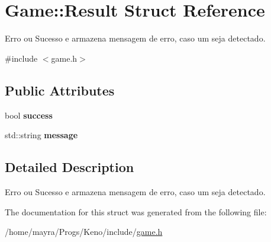 \hypertarget{structGame_1_1Result}{}\section{Game\+:\+:Result Struct Reference}
\label{structGame_1_1Result}


Erro ou Sucesso e armazena mensagem de erro, caso um seja detectado.  




{\ttfamily \#include $<$game.\+h$>$}

\subsection*{Public Attributes}
\begin{DoxyCompactItemize}
\item 
bool {\bfseries success}\hypertarget{structGame_1_1Result_a947391bc085b96ebdbd5396cd2258b80}{}\label{structGame_1_1Result_a947391bc085b96ebdbd5396cd2258b80}

\item 
std\+::string {\bfseries message}\hypertarget{structGame_1_1Result_aba72e8c6b4103ae0c2fffbb90414b988}{}\label{structGame_1_1Result_aba72e8c6b4103ae0c2fffbb90414b988}

\end{DoxyCompactItemize}


\subsection{Detailed Description}
Erro ou Sucesso e armazena mensagem de erro, caso um seja detectado. 

The documentation for this struct was generated from the following file\+:\begin{DoxyCompactItemize}
\item 
/home/mayra/\+Progs/\+Keno/include/\hyperlink{game_8h}{game.\+h}\end{DoxyCompactItemize}
